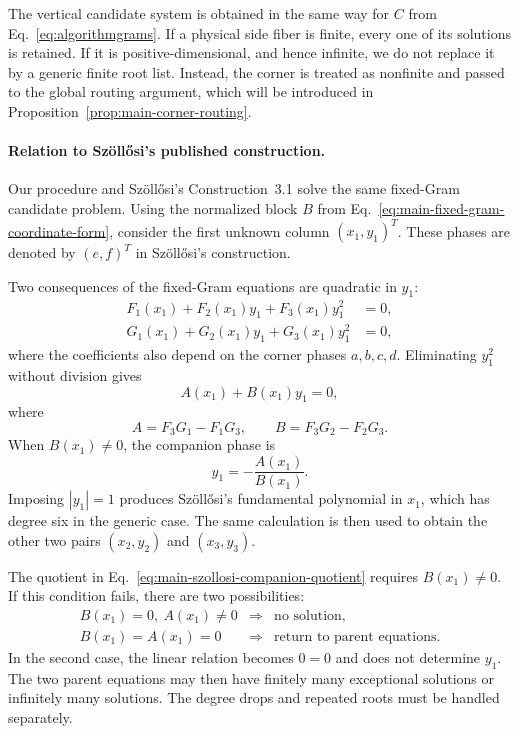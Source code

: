The vertical candidate system is obtained in the same way for $C$ from Eq.~\ref{eq:algorithmgrams}. If a physical side fiber is finite, every one of its solutions is retained. If it is positive-dimensional, and hence infinite, we do not replace it by a generic finite root list. Instead, the corner is treated as nonfinite and passed to the global routing argument, which will be introduced in Proposition~\ref{prop:main-corner-routing}.

\paragraph*{Relation to Sz\"oll\H{o}si's published construction.}
Our procedure and Sz\"oll\H{o}si's Construction~3.1
\cite{Szollosi2012FourParameter} solve the same fixed-Gram candidate problem. Using the normalized block $B$ from Eq.~\eqref{eq:main-fixed-gram-coordinate-form}, consider the first unknown column $(x_1,y_1)^T$. These phases are denoted by $(e,f)^T$ in Sz\"oll\H{o}si's construction.

Two consequences of the fixed-Gram equations are quadratic in $y_1$:
\begin{equation}
\begin{aligned}
F_1(x_1)+F_2(x_1)y_1+F_3(x_1)y_1^2&=0,\\
G_1(x_1)+G_2(x_1)y_1+G_3(x_1)y_1^2&=0,
\end{aligned}
\label{eq:main-szollosi-parent-quadratics}
\end{equation}
where the coefficients also depend on the corner phases $a,b,c,d$.
Eliminating $y_1^2$ without division gives
\begin{equation}
A(x_1)+B(x_1)y_1=0,
\label{eq:main-szollosi-companion-relation}
\end{equation}
where
\begin{equation}
A=F_3G_1-F_1G_3,
\qquad
B=F_3G_2-F_2G_3.
\end{equation}
When $B(x_1)\neq0$, the companion phase is
\begin{equation}
y_1=-\frac{A(x_1)}{B(x_1)}.
\label{eq:main-szollosi-companion-quotient}
\end{equation}
Imposing $|y_1|=1$ produces Sz\"oll\H{o}si's fundamental polynomial in $x_1$, which has degree six in the generic case. The same calculation is then used to obtain the other two pairs $(x_2,y_2)$ and $(x_3,y_3)$.

The quotient in Eq.~\eqref{eq:main-szollosi-companion-quotient} requires
$B(x_1)\neq0$. If this condition fails, there are two possibilities:
\begin{equation}
\begin{array}{rcl}
B(x_1)=0,\ A(x_1)\neq0
&\Longrightarrow& \text{no solution},\\[2pt]
B(x_1)=A(x_1)=0
&\Longrightarrow& \text{return to parent equations.}
\end{array}
\label{eq:main-szollosi-companion-cases}
\end{equation}
In the second case, the linear relation becomes $0=0$ and does not determine $y_1$. The two parent equations may then have finitely many exceptional solutions or infinitely many solutions. The degree drops and repeated roots must be handled separately.

